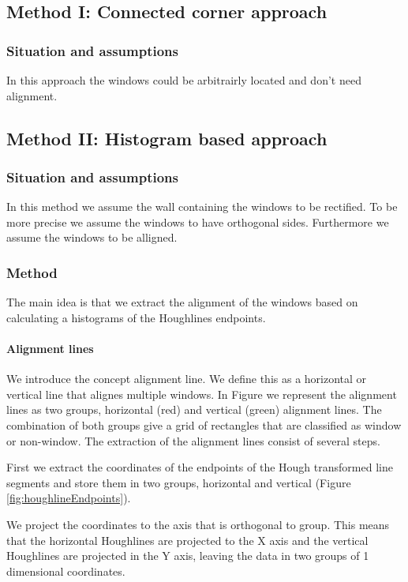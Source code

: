 \subsection{Method I: Connected corner approach} 
\subsubsection{Situation and assumptions}
In this approach the windows could be arbitrairly located and don't need
alignment.

\subsection{Method II: Histogram based approach} 
\subsubsection{Situation and assumptions}
In this method we assume the wall containing the windows to be rectified.
To be more precise we assume the windows to have orthogonal sides.
Furthermore we assume the windows to be alligned.

\subsubsection{Method}
The main idea is that we extract the alignment of the windows based on
calculating a histograms of the Houghlines endpoints.

\paragraph{Alignment lines}
We introduce the concept alignment line. We define this as a horizontal or
vertical line that alignes multiple windows. In Figure%
we represent the alignment lines as two groups, horizontal (red) and
vertical (green) alignment lines.  The combination of both groups give a grid of
rectangles that are classified as window or non-window.
The extraction of the alignment lines consist of several steps.

First we extract the coordinates of the endpoints of the Hough transformed line
segments and store them in two groups, horizontal and vertical (Figure
\ref{fig:houghlineEndpoints}). 

We project the coordinates to the axis that is orthogonal to group. This means
that the horizontal Houghlines are projected to the X axis and the vertical
Houghlines are projected in the Y axis, leaving the data in two groups of 1
dimensional coordinates.

